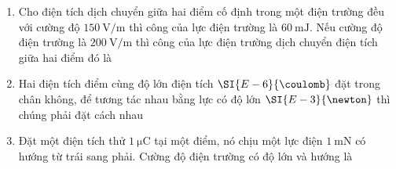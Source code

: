 \begin{enumerate}[label=\bfseries Câu \arabic*:]
\item Cho điện tích dịch chuyển giữa hai điểm cố định trong một điện trường đều với cường độ $\SI{150}{\volt/\meter}$  thì công của lực điện trường là $\SI{60}{\milli\joule}$. Nếu cường độ điện trường là $\SI{200}{\volt/\meter}$  thì công của lực điện trường dịch chuyển điện tích giữa hai điểm đó là

\item Hai điện tích điểm cùng độ lớn điện tích $\SI{E-6}{\coulomb}$  đặt trong chân không, để tương tác nhau bằng lực có độ lớn $\SI{E-3}{\newton}$  thì chúng phải đặt cách nhau

\item Đặt một điện tích thử $\SI{1}{\micro\coulomb}$  tại một điểm, nó chịu một lực điện $\SI{1}{\milli\newton}$  có hướng từ trái sang phải. Cường độ điện trường có độ lớn và hướng là


\end{enumerate}
